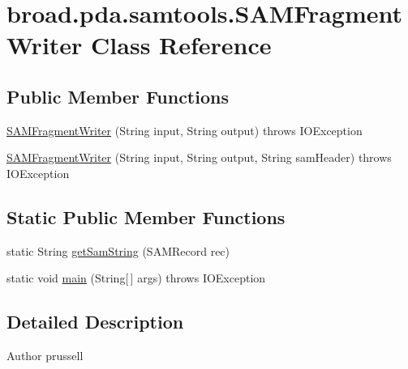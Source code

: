 \hypertarget{classbroad_1_1pda_1_1samtools_1_1_s_a_m_fragment_writer}{\section{broad.\+pda.\+samtools.\+S\+A\+M\+Fragment\+Writer Class Reference}
\label{classbroad_1_1pda_1_1samtools_1_1_s_a_m_fragment_writer}
}
\subsection*{Public Member Functions}
\begin{DoxyCompactItemize}
\item 
\hyperlink{classbroad_1_1pda_1_1samtools_1_1_s_a_m_fragment_writer_af8c178f8c81cc05e0469ef9e082dcdbb}{S\+A\+M\+Fragment\+Writer} (String input, String output)  throws I\+O\+Exception 
\item 
\hyperlink{classbroad_1_1pda_1_1samtools_1_1_s_a_m_fragment_writer_a1c44db1468f602e735d67529c0eebd7f}{S\+A\+M\+Fragment\+Writer} (String input, String output, String sam\+Header)  throws I\+O\+Exception 
\end{DoxyCompactItemize}
\subsection*{Static Public Member Functions}
\begin{DoxyCompactItemize}
\item 
static String \hyperlink{classbroad_1_1pda_1_1samtools_1_1_s_a_m_fragment_writer_a488dd5ae131e2829175cd3d200ceb1e0}{get\+Sam\+String} (S\+A\+M\+Record rec)
\item 
static void \hyperlink{classbroad_1_1pda_1_1samtools_1_1_s_a_m_fragment_writer_a0c8dfc56d2eefdffc5c5073cce9d4adc}{main} (String\mbox{[}$\,$\mbox{]} args)  throws I\+O\+Exception 
\end{DoxyCompactItemize}


\subsection{Detailed Description}
\begin{DoxyAuthor}{Author}
prussell 
\end{DoxyAuthor}


